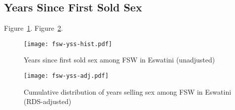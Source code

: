 \subsection{Years Since First Sold Sex}\label{app.model.res.fsw.dur}
Figure~\ref{fig:fsw.yss.raw}.
Figure~\ref{fig:fsw.yss.adj}.
\begin{figure}
  \texttt{[image: fsw-yss-hist.pdf]}
  \caption{Years since first sold sex among FSW in Eswatini (unadjusted)}
  \label{fig:fsw.yss.raw}
\end{figure}
\begin{figure}
  \centering
  \texttt{[image: fsw-yss-adj.pdf]}
  \caption{Cumulative distribution of years selling sex among FSW in Eswatini (RDS-adjusted)}
  \label{fig:fsw.yss.adj}
\end{figure}